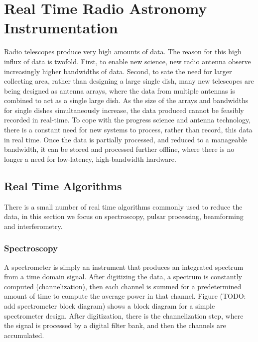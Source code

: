 \chapter{Real Time Radio Astronomy Instrumentation}

Radio telescopes produce very high amounts of data. 
The reason for this high influx of data is twofold. 
First, to enable new science, new radio antenna observe increasingly higher bandwidths of data. 
Second, to sate the need for larger collecting area, rather than designing a large single dish, many new telescopes are being designed as antenna arrays, where the data from multiple antennas is combined to act as a single large dish.
As the size of the arrays and bandwidths for single dishes simultaneously increase, the data produced cannot be feasibly recorded in real-time. 
To cope with the progress science and antenna technology, there is a constant need for new systems to process, rather than record, this data in real time.
Once the data is partially processed, and reduced to a manageable bandwidth, it can be stored and processed further offline, where there is no longer a need for low-latency, high-bandwidth hardware.


\section{Real Time Algorithms}
There is a small number of real time algorithms commonly used to reduce the data, in this section we focus on spectroscopy, pulsar processing, beamforming and interferometry. 


\subsection{Spectroscopy}
A spectrometer is simply an instrument that produces an integrated spectrum from a time domain signal. After digitizing the data, a spectrum is constantly computed (channelization), then each channel is summed for a predetermined amount of time to compute the average power in that channel. Figure (TODO: add spectrometer block diagram) shows a block diagram for a simple spectrometer design. After digitization, there is the channelization step, where the signal is processed by a digital filter bank, and then the channels are accumulated. 

